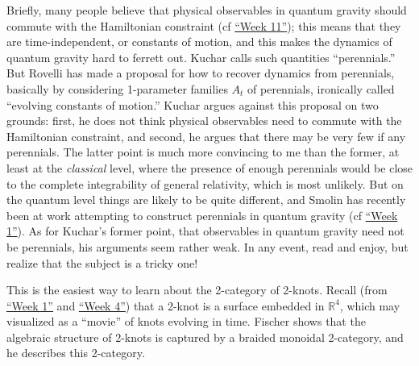 \documentclass{article}
\def\tightlist{}
\renewcommand{\texttt}[1]{%
  \begingroup
  \ttfamily
  \begingroup\lccode`~=`/\lowercase{\endgroup\def~}{/\discretionary{}{}{}}%
  \begingroup\lccode`~=`[\lowercase{\endgroup\def~}{[\discretionary{}{}{}}%
  \begingroup\lccode`~=`.\lowercase{\endgroup\def~}{.\discretionary{}{}{}}%
  \catcode`/=\active\catcode`[=\active\catcode`.=\active
  \scantokens{#1\noexpand}%
  \endgroup
}
\begin{document}
Briefly, many people believe that physical observables in quantum
gravity should commute with the Hamiltonian constraint (cf
\protect\hyperlink{week11}{``Week 11''}); this means that they are
time-independent, or constants of motion, and this makes the dynamics of
quantum gravity hard to ferrett out. Kuchar calls such quantities
``perennials.'' But Rovelli has made a proposal for how to recover
dynamics from perennials, basically by considering 1-parameter families
\(A_t\) of perennials, ironically called ``evolving constants of
motion.'' Kuchar argues against this proposal on two grounds: first, he
does not think physical observables need to commute with the Hamiltonian
constraint, and second, he argues that there may be very few if any
perennials. The latter point is much more convincing to me than the
former, at least at the \emph{classical} level, where the presence of
enough perennials would be close to the complete integrability of
general relativity, which is most unlikely. But on the quantum level
things are likely to be quite different, and Smolin has recently been at
work attempting to construct perennials in quantum gravity (cf
\protect\hyperlink{week1}{``Week 1''}). As for Kuchar's former point,
that observables in quantum gravity need not be perennials, his
arguments seem rather weak. In any event, read and enjoy, but realize
that the subject is a tricky one!


This is the easiest way to learn about the 2-category of 2-knots. Recall
(from \protect\hyperlink{week1}{``Week 1''} and
\protect\hyperlink{week4}{``Week 4''}) that a 2-knot is a surface
embedded in \(\mathbb{R}^4\), which may visualized as a ``movie'' of
knots evolving in time. Fischer shows that the algebraic structure of
2-knots is captured by a braided monoidal 2-category, and he describes
this 2-category.

\end{document}
